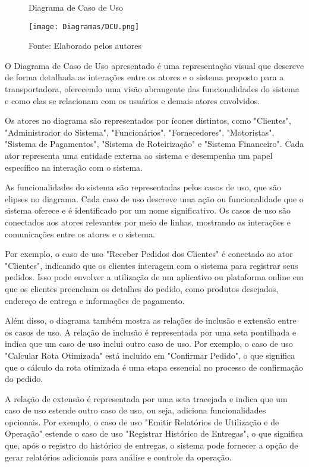 \begin{figure}[H]
    \centering
    \caption{Diagrama de Caso de Uso}
    \label{fig:DCU}
    \texttt{[image: Diagramas/DCU.png]}\\
    \caption*{Fonte: Elaborado pelos autores}
\end{figure}

O Diagrama de Caso de Uso apresentado é uma representação visual que descreve de forma detalhada as interações entre os atores e o sistema proposto para a transportadora, oferecendo uma visão abrangente das funcionalidades do sistema e como elas se relacionam com os usuários e demais atores envolvidos.

Os atores no diagrama são representados por ícones distintos, como "Clientes", "Administrador do Sistema", "Funcionários", "Fornecedores", "Motoristas", "Sistema de Pagamentos", "Sistema de Roteirização" e "Sistema Financeiro". Cada ator representa uma entidade externa ao sistema e desempenha um papel específico na interação com o sistema.

As funcionalidades do sistema são representadas pelos casos de uso, que são elipses no diagrama. Cada caso de uso descreve uma ação ou funcionalidade que o sistema oferece e é identificado por um nome significativo. Os casos de uso são conectados aos atores relevantes por meio de linhas, mostrando as interações e comunicações entre os atores e o sistema.

Por exemplo, o caso de uso "Receber Pedidos dos Clientes" é conectado ao ator "Clientes", indicando que os clientes interagem com o sistema para registrar seus pedidos. Isso pode envolver a utilização de um aplicativo ou plataforma online em que os clientes preencham os detalhes do pedido, como produtos desejados, endereço de entrega e informações de pagamento.

Além disso, o diagrama também mostra as relações de inclusão e extensão entre os casos de uso. A relação de inclusão é representada por uma seta pontilhada e indica que um caso de uso inclui outro caso de uso. Por exemplo, o caso de uso "Calcular Rota Otimizada" está incluído em "Confirmar Pedido", o que significa que o cálculo da rota otimizada é uma etapa essencial no processo de confirmação do pedido.

A relação de extensão é representada por uma seta tracejada e indica que um caso de uso estende outro caso de uso, ou seja, adiciona funcionalidades opcionais. Por exemplo, o caso de uso "Emitir Relatórios de Utilização e de Operação" estende o caso de uso "Registrar Histórico de Entregas", o que significa que, após o registro do histórico de entregas, o sistema pode fornecer a opção de gerar relatórios adicionais para análise e controle da operação.
